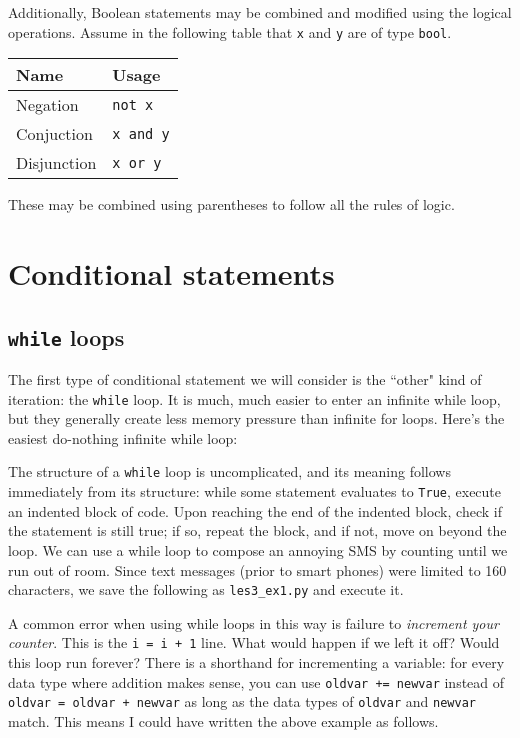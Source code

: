 \documentclass[m3380-lec-main.tex]{subfiles}
\begin{document}
Additionally, Boolean statements may be combined and modified using the logical operations. Assume in the following table that \verb|x| and \verb|y| are of type \verb|bool|.
\begin{center}\begin{tabular}{l|l}
\textbf{Name} & \textbf{Usage} \\ \hline
Negation & \verb|not x| \\
Conjuction & \verb|x and y|\\
Disjunction & \verb|x or y| \\
\end{tabular}\end{center}
These may be combined using parentheses to follow all the rules of logic.
 
\section{Conditional statements}
\subsection{\texttt{while} loops}
The first type of conditional statement we will consider is the ``other" kind of iteration: the \verb|while| loop. It is much, much easier to enter an infinite while loop, but they generally create less memory pressure than infinite for loops. Here's the easiest do-nothing infinite while loop:

\smallskip\noindent
The structure of a \verb|while| loop is uncomplicated, and its meaning follows immediately from its structure: while some statement evaluates to \verb|True|, execute an indented block of code. Upon reaching the end of the indented block, check if the statement is still true; if so, repeat the block, and if not, move on beyond the loop. We can use a while loop to compose an annoying SMS by counting until we run out of room. Since text messages (prior to smart phones) were limited to 160 characters, we save the following as \verb|les3_ex1.py| and execute it.

\smallskip\noindent
A common error when using while loops in this way is failure to \emph{increment your counter}. This is the \verb|i = i + 1| line. What would happen if we left it off? Would this loop run forever? There is a shorthand for incrementing a variable: for every data type where addition makes sense, you can use \verb|oldvar += newvar| instead of \verb|oldvar = oldvar + newvar| as long as the data types of \verb|oldvar| and \verb|newvar| match. This means I could have written the above example as follows.
\end{document}
